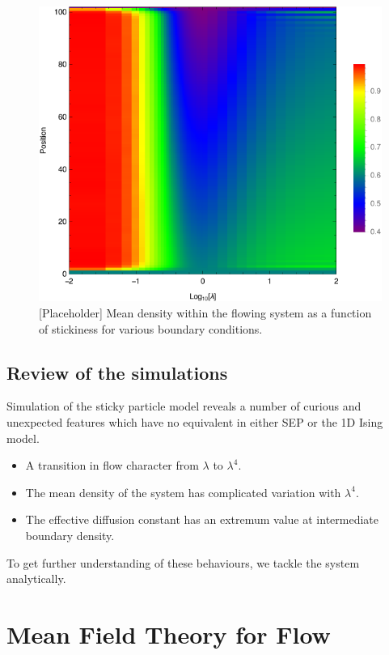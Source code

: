 \documentclass[
reprint, amsmath,amssymb,
]{revtex4-1}
\begin{document}
\begin{figure}[h!]
\vspace{1em}
\begin{center}
\includegraphics[width=0.5\linewidth]{graemeDensityProfile.pdf}
\end{center}
    \vspace{-0em}
\caption{\label{fig:flowStats} [Placeholder] Mean density within the flowing system as a function of stickiness for various boundary conditions.   
}
\end{figure}


\subsection{Review of the simulations}

Simulation of the sticky particle model reveals a number of curious
and unexpected features which have no equivalent in either SEP or the
1D Ising model.

\begin{itemize} \item 
A transition in flow character from $\lambda$ to $\lambda^4$.  
\item
The mean density of the system  has complicated variation with  $\lambda^4$.  
\item 
The effective diffusion constant has an extremum value at
  intermediate boundary density.
\end{itemize}

To get further understanding of these behaviours, we tackle the system
analytically.

\section{Mean Field Theory for Flow}
  
\end{document}
